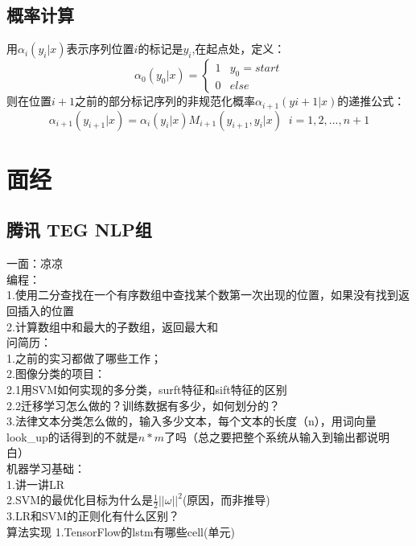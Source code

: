 \documentclass[UTF8]{article}%
\begin{document}
	\subsection{概率计算}
	用$\alpha_i(y_i|x)$表示序列位置$i$的标记是$y_i$,在起点处，定义：
	$$\alpha_0(y_0|x)= \begin{cases} 1 & {y_0 =start}\\ 0 & {else} \end{cases}$$
	则在位置$i+1$之前的部分标记序列的非规范化概率$\alpha_{i+1}(yi+1|x)$的递推公式：
	$$\alpha_{i+1}(y_{i+1}|x) = \alpha_i(y_i|x)M_{i+1}(y_{i+1},y_i|x) \;\; i=1,2,...,n+1$$
	\newpage
	\section{面经}
	\date{2019年3月8日} 
	\subsection{腾讯 TEG NLP组}
	一面：凉凉\\
	编程：\\
	1.使用二分查找在一个有序数组中查找某个数第一次出现的位置，如果没有找到返回插入的位置\\
	2.计算数组中和最大的子数组，返回最大和\\
	问简历：\\
	1.之前的实习都做了哪些工作；\\
	2.图像分类的项目：\\
	2.1用SVM如何实现的多分类，surft特征和sift特征的区别\\
	2.2迁移学习怎么做的？训练数据有多少，如何划分的？\\
	3.法律文本分类怎么做的，输入多少文本，每个文本的长度（n），用词向量look\_up的话得到的不就是$ n*m $了吗（总之要把整个系统从输入到输出都说明白）\\
	机器学习基础：\\
	1.讲一讲LR\\
	2.SVM的最优化目标为什么是$\frac{1}{2}||\omega||^2$(原因，而非推导)\\
	3.LR和SVM的正则化有什么区别？\\
	算法实现
	1.TensorFlow的lstm有哪些cell(单元)\\
	
	\date{2019年3月29日}
\end{document}
